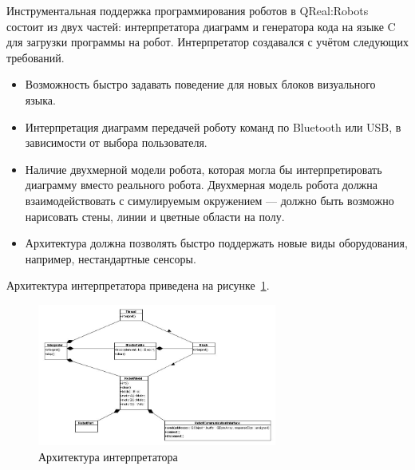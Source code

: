 \documentclass[a4paper]{article}
\begin{document}
{Инструментальная поддержка программирования роботов в QReal:Robots состоит из двух частей: интерпретатора диаграмм и генератора кода на языке C для загрузки программы на робот. Интерпретатор создавался с учётом следующих требований.
\begin{itemize}
  \item Возможность быстро задавать поведение для новых блоков визуального языка.
  \item Интерпретация диаграмм передачей роботу команд по Bluetooth или USB, в зависимости от выбора пользователя.
  \item Наличие двухмерной модели робота, которая могла бы интерпретировать диаграмму вместо реального робота. Двухмерная модель робота должна взаимодействовать с симулируемым окружением --- должно быть возможно нарисовать стены, линии и цветные области на полу.
  \item Архитектура должна позволять быстро поддержать новые виды оборудования, например, нестандартные сенсоры.
\end{itemize}

Архитектура интерпретатора приведена на рисунке~\ref{interpreterArchitecture}.

\begin{figure} [ht]
  \begin{center}
    \includegraphics[width=0.7\textwidth]{interpreterArchitecture.jpg}
    \caption{Архитектура интерпретатора}
    \label{interpreterArchitecture}
  \end{center}
\end{figure}

}
\end{document}
